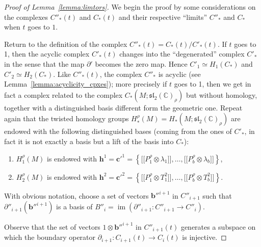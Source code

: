 \documentclass[a4paper]{amsart}
\theoremstyle{plain}
\theoremstyle{definition}
\theoremstyle{remark}
\newcommand{\CC}{{\mathbb C}}
\newcommand{\im}{\mathop{\mathrm{im}}\nolimits}
\newcommand{\sllrho}{\mathfrak{sl}_2(\CC)_\rho}
\newcommand{\bbrack}[1]{\lbrack \! \lbrack #1 \rbrack \! \rbrack}
\newcommand{\cbasis}[2][c]{\mathbf{#1}^{#2}}
\newcommand{\bbasis}[2][b]{\mathbf{#1}^{#2}}
\newcommand{\hbasis}[2][h]{\mathbf{#1}^{#2}}
\begin{document}
\begin{proof}[Proof of Lemma~\ref{lemma:limtors}]

  We begin the proof by some considerations on the complexes
  $C''_*(t)$ and $C_*(t)$ and their respective ``limits'' $C''_*$ and
  $C_*$ when $t$ goes to $1$.

  Return to the definition of the complex $C''_*(t) = C_*(t) /
  C'_*(t)$.  If $t$ goes to 1, then the acyclic complex $C'_*(t)$
  changes into the ``degenerated'' complex $C'_*$ in the sense that
  the map $\partial'$ becomes the zero map.  Hence $C'_1 \simeq
  H_1(C_*)$ and $C'_2 \simeq H_2(C_*)$.  Like $C''_*(t)$, the complex
  $C''_*$ is acyclic (see Lemma~\ref{lemma:acyclicity_cpxes}); more
  precisely if $t$ goes to 1, then we get in fact a complex related to
  the complex $C_*(M; \sllrho)$ but without homology, together with a
  distinguished basis different form the geometric one.  Repeat again
  that the twisted homology groups $H_*^\rho(M) = H_*(M; \sllrho)$ are
  endowed with the following distinguished bases (coming from the ones
  of $C'_*$, in fact it is not exactly a basis but a lift of the basis
  into $C_*$):
  \begin{enumerate}
  \item $H^\rho_1(M)$ is endowed with 
    $\hbasis{1} = \cbasis[c']{1} =
    \left\{ 
      \bbrack{P^\rho_1 \otimes \lambda_1}, 
        \ldots,
      \bbrack{P^\rho_b \otimes \lambda_b} 
    \right\}$,
  \item $H^\rho_2(M)$ is endowed with $\hbasis{2} = \cbasis[c']{2} =
    \left\{ 
       \bbrack{P^\rho_1 \otimes T^2_1}, 
         \ldots, 
       \bbrack{P^\rho_b \otimes T^2_b} 
    \right\}$.
  \end{enumerate}
  
  With obvious notation, choose a set of vectors $\bbasis[b'']{i+1}$ in
  $C''_{i+1}$ such that $\partial''_{i+1}(\bbasis[b'']{i+1})$ is a basis
  of $B''_i = \im(\partial''_{i+1}\colon C''_{i+1} \to C''_i)$.

  Observe that the set of vectors $1 \otimes \bbasis[b'']{i+1}$ in
  $C''_{i+1}(t)$ generates a subspace on which the boundary operator
  $\partial_{i+1}\colon C_{i+1}(t) \to C_i(t)$ is injective.
 

\end{proof}
\end{document}
